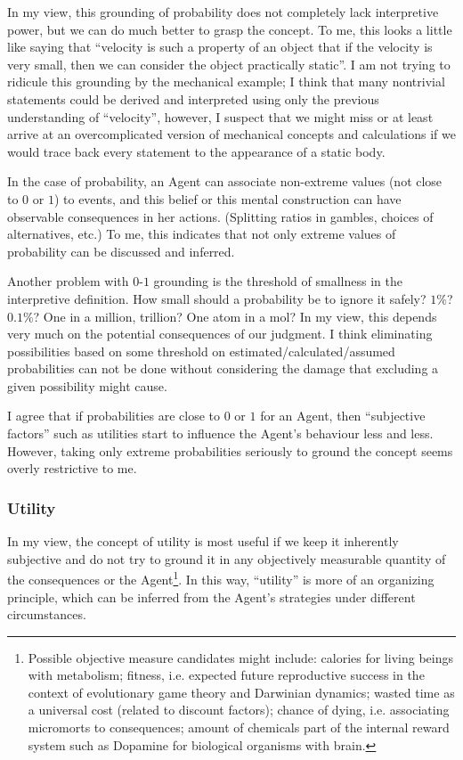 \documentclass{article}
\begin{document}
In my view, this grounding of probability does not completely lack interpretive power, but we can do much better to grasp the concept. To me, this looks a little like saying that ``velocity is such a property of an object that if the velocity is very small, then we can consider the object practically static''. I am not trying to ridicule this grounding by the mechanical example; I think that many nontrivial statements could be derived and interpreted using only the previous understanding of ``velocity'', however, I suspect that we might miss or at least arrive at an overcomplicated version of mechanical concepts and calculations if we would trace back every statement to the appearance of a static body.

In the case of probability, an Agent can associate non-extreme values (not close to $0$ or $1$) to events, and this belief or this mental construction can have observable consequences in her actions. (Splitting ratios in gambles, choices of alternatives, etc.)
To me, this indicates that not only extreme values of probability can be discussed and inferred.

Another problem with $0$-$1$ grounding is the threshold of smallness in the interpretive definition. How small should a probability be to ignore it safely? $1\%$? $0.1\%$? One in a million, trillion? One atom in a mol?
In my view, this depends very much on the potential consequences of our judgment. I think eliminating possibilities based on some threshold on estimated/calculated/assumed probabilities can not be done without considering the damage that excluding a given possibility might cause.

I agree that if probabilities are close to $0$ or $1$ for an Agent, then ``subjective factors'' such as utilities start to influence the Agent's behaviour less and less. However, taking only extreme probabilities seriously to ground the concept seems overly restrictive to me.


\subsubsection*{Utility}

In my view, the concept of utility is most useful if we keep it inherently subjective and do not try to ground it in any objectively measurable quantity of the consequences or the Agent\footnote{Possible objective measure candidates might include: calories \cite{paper:DietSelectionAndOptimization,book:NewEcology} for living beings with metabolism; fitness, i.e. expected future reproductive success in the context of evolutionary game theory and Darwinian dynamics; wasted time as a universal cost (related to discount factors); chance of dying, i.e. associating micromorts \cite{paper:Micromorts,book:Micromorts} to consequences; amount of chemicals part of the internal reward system such as Dopamine for biological organisms with brain.}.
In this way, ``utility'' is more of an organizing principle, which can be inferred from the Agent's strategies under different circumstances.
\end{document}
